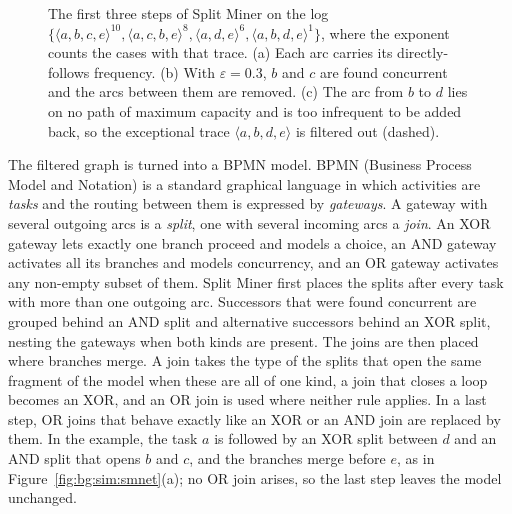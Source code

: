 \begin{figure}[t]
    \caption{The first three steps of Split Miner on the log
    $\{\langle a,b,c,e \rangle^{10}, \langle a,c,b,e \rangle^{8},
    \langle a,d,e \rangle^{6}, \langle a,b,d,e \rangle^{1}\}$, where the exponent
    counts the cases with that trace. (a) Each arc carries its directly-follows
    frequency. (b) With $\varepsilon = 0.3$, $b$ and $c$ are found concurrent and
    the arcs between them are removed. (c) The arc from $b$ to $d$ lies on no
    path of maximum capacity and is too infrequent to be added back, so the
    exceptional trace $\langle a,b,d,e \rangle$ is filtered out (dashed).}
    \label{fig:bg:sim:splitminer}
    \end{figure}
    
    The filtered graph is turned into a BPMN model. BPMN (Business Process Model
    and Notation) is a standard graphical language in which activities are
    \emph{tasks} and the routing between them is expressed by \emph{gateways}. A
    gateway with several outgoing arcs is a \emph{split}, one with several
    incoming arcs a \emph{join}. An XOR gateway lets exactly one branch proceed
    and models a choice, an AND gateway activates all its branches and models
    concurrency, and an OR gateway activates any non-empty subset of
    them. Split Miner first places the splits after
    every task with more than one outgoing arc. Successors that were found
    concurrent are grouped behind an AND split and alternative successors behind
    an XOR split, nesting the gateways when both kinds are present. The joins are
    then placed where branches merge. A join takes the type of the splits that
    open the same fragment of the model when these are all of one kind, a join
    that closes a loop becomes an XOR, and an OR join is used where neither rule
    applies. In a last step, OR joins that behave exactly like an XOR or an AND
    join are replaced by
    them. In the example, the task $a$ is followed by
    an XOR split between $d$ and an AND split that opens $b$ and $c$, and the
    branches merge before $e$, as in
    Figure~\ref{fig:bg:sim:smnet}(a); no OR join arises, so the last step leaves
    the model unchanged.
    
